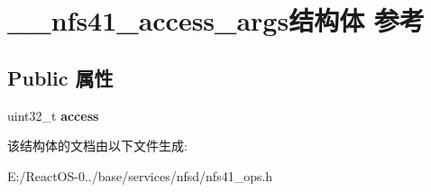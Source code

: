 \hypertarget{struct____nfs41__access__args}{}\section{\+\_\+\+\_\+nfs41\+\_\+access\+\_\+args结构体 参考}
\label{struct____nfs41__access__args}
\subsection*{Public 属性}
\begin{DoxyCompactItemize}
\item 
\mbox{\label{struct____nfs41__access__args_afddcd5daa14826d15c7ff22c309ccd6d}} 
uint32\+\_\+t {\bfseries access}
\end{DoxyCompactItemize}


该结构体的文档由以下文件生成\+:\begin{DoxyCompactItemize}
\item 
E\+:/\+React\+O\+S-\/0../base/services/nfsd/nfs41\+\_\+ops.\+h\end{DoxyCompactItemize}
